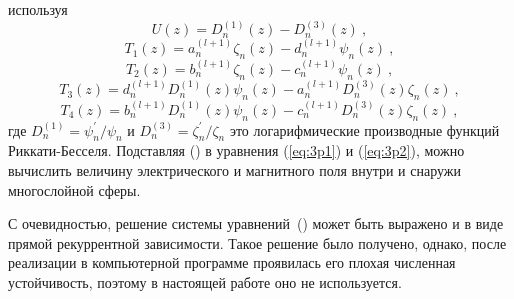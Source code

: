 используя
\begin{equation*}
  U(z) =    {D^{(1)}_{n}}(z) - {D^{(3)}_{n}}(z)\:,
\end{equation*}
\begin{equation*}
  T_1(z) =   a^{(l+1)}_{n}  \zeta_{n}(z) 
           - d^{(l+1)}_{n}  \psi_{n}(z)\:,
\end{equation*}
\begin{equation*}
  T_2(z) =   b^{(l+1)}_{n}  \zeta_{n}(z) 
           - c^{(l+1)}_{n}  \psi_{n}(z)\:,
\end{equation*}
\begin{equation*}
  T_3(z) =  d^{(l+1)}_{n}  D^{(1)}_{n}(z)  \psi_{n}(z) 
          - a^{(l+1)}_{n}  D^{(3)}_{n}(z)  \zeta_{n} (z)\:,
\end{equation*}
\begin{equation*}
  T_4(z) =  b^{(l+1)}_{n}  D^{(1)}_{n}(z)  \psi_{n}(z) 
          - c^{(l+1)}_{n}  D^{(3)}_{n}(z)  \zeta_{n} (z)\:,
\end{equation*}
где  $D^{(1)}_{n} = \psi^{\prime}_{n}/\psi_{n}$ и
$D^{(3)}_{n} = \zeta^{\prime}_{n}/\zeta_{n}$ это логарифмические
производные функций Риккати-Бесселя. Подставляя
() в уравнения (\ref{eq:3p1}) и
(\ref{eq:3p2}), можно вычислить величину электрического и магнитного
поля внутри и снаружи многослойной сферы.

С очевидностью, решение системы
уравнений~() может быть
выражено и в виде прямой рекуррентной зависимости. Такое решение было
получено, однако, после реализации в компьютерной программе проявилась
его плохая численная устойчивость, поэтому в настоящей работе
оно не используется.

